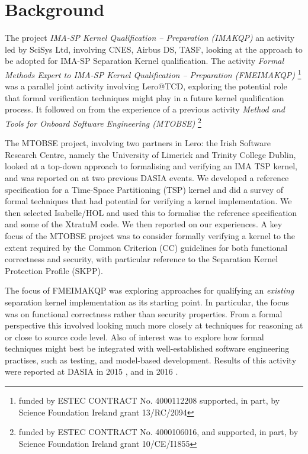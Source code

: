 
\section{Background}

The project
\textit{IMA-SP Kernel Qualification – Preparation (IMAKQP)}
an  activity led by SciSys Ltd,
involving CNES, Airbus DS, TASF,
looking at the approach to be adopted for IMA-SP Separation Kernel qualification.
The activity
\textit{Formal Methods Expert to IMA-SP Kernel Qualification – Preparation
(FMEIMAKQP)}
\footnote{
   funded by ESTEC CONTRACT No. 4000112208
   supported, in part, by Science Foundation Ireland grant 13/RC/2094
}
was a parallel joint activity involving Lero@TCD,
exploring the potential role that formal verification techniques
might play in a future kernel qualification process.
It followed on from the experience of a previous activity
\textit{Method and Tools for Onboard Software Engineering (MTOBSE)}
 \footnote{
   funded by ESTEC CONTRACT No. 4000106016,
   and supported, in part, by Science Foundation Ireland grant 10/CE/I1855
}

The MTOBSE project, involving two partners in Lero: the Irish Software Research Centre,
namely the University of Limerick and Trinity College Dublin,
 looked at a top-down approach to formalising and verifying
an IMA TSP kernel,
and was reported on at two previous DASIA events\cite{MTOBSE-DASIA13,MTOBSE-DASIA13}.
We developed a reference specification for a Time-Space Partitioning (TSP) kernel\cite{MTOBSE-D03} and did a survey of formal techniques that had
potential for verifying a kernel implementation\cite{MTOBSE-D04,MTOBSE-D06}.
We then selected Isabelle/HOL\cite{NPW02} and used this to formalise the
reference specification and some of the XtratuM code\cite{MTOBSE-D07}.
We then reported on our experiences\cite{MTOBSE-D08}.
A key focus of the MTOBSE project was to consider formally verifying a kernel
to the extent required by the Common Criterion (CC) guidelines for both functional correctness and security\cite{RD-07},
with particular reference to the Separation Kernel Protection Profile (SKPP)\cite{RD-08}.

The focus of FMEIMAKQP was exploring approaches for qualifying
an \emph{existing} separation kernel implementation as its starting point.
In particular,
the focus was on functional correctness rather than security properties.
From a formal perspective this involved looking much more closely at techniques
for reasoning at or close to source code level.
Also of interest was to explore how formal techniques might best be integrated
with well-established software engineering practises,
such as testing, and model-based development.
Results of this activity
were reported at DASIA in 2015 \cite{FMEIMAKQP-DASIA15},
and in 2016 \cite{FMEIMAKQP-DASIA16}.


